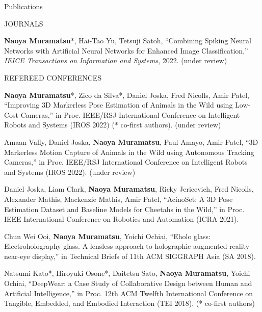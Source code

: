 \documentclass{resume} %
\begin{document}

\begin{rSection}{Publications} \itemsep 4pt

    \begin{rSubsection}{JOURNALS}{}{}{}{}
        \item \textbf{Naoya Muramatsu}*, Hai-Tao Yu, Tetsuji Satoh, ``Combining Spiking Neural Networks with Artificial Neural Networks for Enhanced Image Classification,'' \textit{IEICE Transactions on Information and Systems}, 2022. (under review)
    \end{rSubsection}

    \begin{rSubsection}{REFEREED CONFERENCES}{}{}{}{}
        \item \textbf{Naoya Muramatsu}*, Zico da Silva*, Daniel Joska, Fred Nicolls, Amir Patel, ``Improving 3D Markerless Pose Estimation of Animals in the Wild using Low-Cost Cameras,'' in Proc. IEEE/RSJ International Conference on Intelligent Robots and Systems (IROS 2022) (* co-first authors). (under review)
        \item Amaan Vally, Daniel Joska, \textbf{Naoya Muramatsu}, Paul Amayo, Amir Patel, ``3D Markerless Motion Capture of Animals in the Wild using Autonomous Tracking Cameras,'' in Proc. IEEE/RSJ International Conference on Intelligent Robots and Systems (IROS 2022). (under review)
        \item Daniel Joska, Liam Clark, \textbf{Naoya Muramatsu}, Ricky Jericevich, Fred Nicolls, Alexander Mathis, Mackenzie Mathis, Amir Patel, ``AcinoSet: A 3D Pose Estimation Dataset and Baseline Models for Cheetahs in the Wild,'' in Proc. IEEE International Conference on Robotics and Automation (ICRA 2021).
        \item Chun Wei Ooi, \textbf{Naoya Muramatsu}, Yoichi Ochiai, ``Eholo glass: Electroholography glass. A lensless approach to holographic augmented reality near-eye display,'' in Technical Briefs of 11th ACM SIGGRAPH Asia (SA 2018).
        \item Natsumi Kato*, Hiroyuki Osone*, Daitetsu Sato, \textbf{Naoya Muramatsu}, Yoichi Ochiai, ``DeepWear: a Case Study of Collaborative Design between Human and Artificial Intelligence,''  in Proc. 12th ACM Twelfth International Conference on Tangible, Embedded, and Embodied Interaction (TEI 2018). (* co-first authors)

\end{rSubsection}
\end{rSection}
\end{document}
